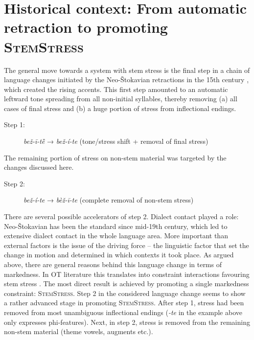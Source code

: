 \documentclass[output=paper,modfonts,nonflat
]{langsci/langscibook}
\begin{document}
\section{Historical context: From automatic retraction to promoting \textsc{StemStress}} \label{sec:kager:5}

The general move towards a system with stem stress is the final step in a chain of language changes initiated by the Neo-Štokavian retractions in the 15th century \citep[162--168]{Bethin2006}, which created the rising accents. This first step amounted to an automatic leftward tone spreading from all non-initial syllables, thereby removing (a) all cases of final stress and (b) a huge portion of stress from inflectional endings. 
\begin{description}
    \item[Step 1:] \textit{bež-ī-tȅ} → \textit{bež-í-te} (tone/stress shift + removal of final stress)
\end{description}

\noindent The remaining portion of stress on non-stem material was targeted by the changes discussed here.

\begin{description}
    \item[Step 2:] \textit{bež-í-te} → \textit{bèž-ī-te}  (complete removal of non-stem stress)
\end{description}

\noindent There are several possible accelerators of step 2. Dialect contact played a role: Neo-Štokavian has been the standard since mid-19th century, which led to extensive dialect contact in the whole language area. More important than external factors is the issue of the driving force – the linguistic factor that set the change in motion and determined in which contexts it took place. As argued above, there are general reasons behind this language change in terms of markedness. In OT literature this translates into constraint interactions favouring stem stress \citep[e.g.][]{Revithiadou1999, Alderete2001, Kager2000}. The most direct result is achieved by promoting a single markedness constraint: \textsc{StemStress}. 
Step 2 in the considered language change seems to show a rather advanced stage in promoting \textsc{StemStress}. After step 1, stress had been removed from most unambiguous inflectional endings (\textit{-te} in the example above only expresses phi-features). Next, in step 2, stress is removed from the remaining non-stem material (theme vowels, augments etc.).
\end{document}
